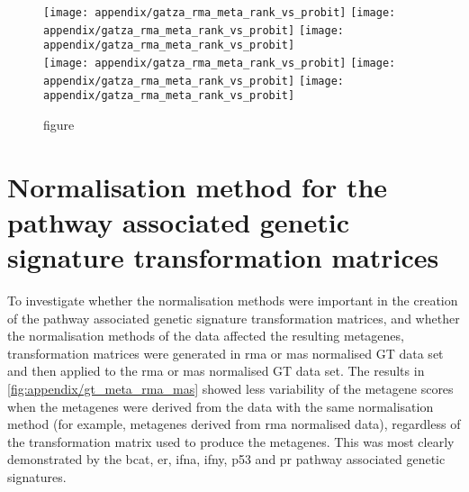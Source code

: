 	\begin{figure}[htpb]
		\ContinuedFloat
		\captionsetup{list=off,format=cont}
		\centering
		\texttt{[image: appendix/gatza\_rma\_meta\_rank\_vs\_probit]}
		\texttt{[image: appendix/gatza\_rma\_meta\_rank\_vs\_probit]}
		\texttt{[image: appendix/gatza\_rma\_meta\_rank\_vs\_probit]}\\
		\texttt{[image: appendix/gatza\_rma\_meta\_rank\_vs\_probit]}
		\texttt{[image: appendix/gatza\_rma\_meta\_rank\_vs\_probit]}
		\texttt{[image: appendix/gatza\_rma\_meta\_rank\_vs\_probit]}\\
		\vspace{1em}
		\caption[]{figure}
	\end{figure}

	\section{Normalisation method for the pathway associated genetic signature transformation matrices}
	\label{sec:normalisation_method_for_pathway_associated_genetic_signature_transformation_matrices}

	To investigate whether the normalisation methods were important in the creation of the pathway associated genetic signature transformation matrices, and whether the normalisation methods of the data affected the resulting metagenes, transformation matrices were generated in \gls{rma} or \gls{mas} normalised GT data set and then applied to the \gls{rma} or \gls{mas} normalised GT data set.
	The results in \cref{fig:appendix/gt_meta_rma_mas} showed less variability of the metagene scores when the metagenes were derived from the data with the same normalisation method (for example, metagenes derived from \gls{rma} normalised data), regardless of the transformation matrix used to produce the metagenes.
	This was most clearly demonstrated by the \gls{bcat}, \gls{er}, \gls{ifna}, \gls{ifny}, p53 and \gls{pr} pathway associated genetic signatures.

